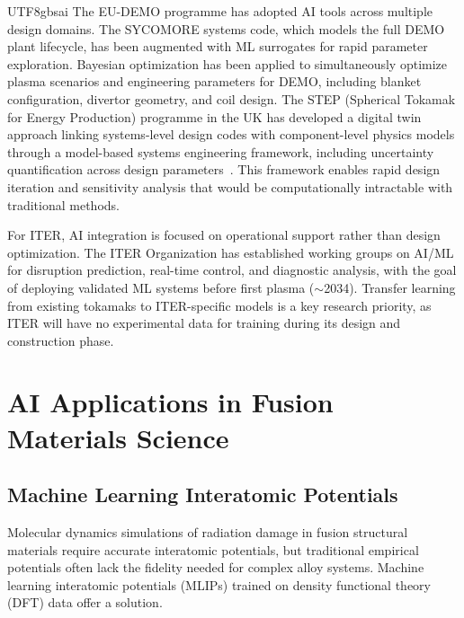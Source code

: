 \documentclass[12pt,a4paper]{article}
\begin{document}
\begin{CJK}{UTF8}{gbsai}
The EU-DEMO programme has adopted AI tools across multiple design domains. The SYCOMORE systems code, which models the full DEMO plant lifecycle, has been augmented with ML surrogates for rapid parameter exploration. Bayesian optimization has been applied to simultaneously optimize plasma scenarios and engineering parameters for DEMO, including blanket configuration, divertor geometry, and coil design. The STEP (Spherical Tokamak for Energy Production) programme in the UK has developed a digital twin approach linking systems-level design codes with component-level physics models through a model-based systems engineering framework, including uncertainty quantification across design parameters~\citep{Kemp2024STEP}. This framework enables rapid design iteration and sensitivity analysis that would be computationally intractable with traditional methods.

For ITER, AI integration is focused on operational support rather than design optimization. The ITER Organization has established working groups on AI/ML for disruption prediction, real-time control, and diagnostic analysis, with the goal of deploying validated ML systems before first plasma ($\sim$2034). Transfer learning from existing tokamaks to ITER-specific models is a key research priority, as ITER will have no experimental data for training during its design and construction phase.

\section{AI Applications in Fusion Materials Science}

\subsection{Machine Learning Interatomic Potentials}

Molecular dynamics simulations of radiation damage in fusion structural materials require accurate interatomic potentials, but traditional empirical potentials often lack the fidelity needed for complex alloy systems. Machine learning interatomic potentials (MLIPs) trained on density functional theory (DFT) data offer a solution.


\end{CJK}
\end{document}
